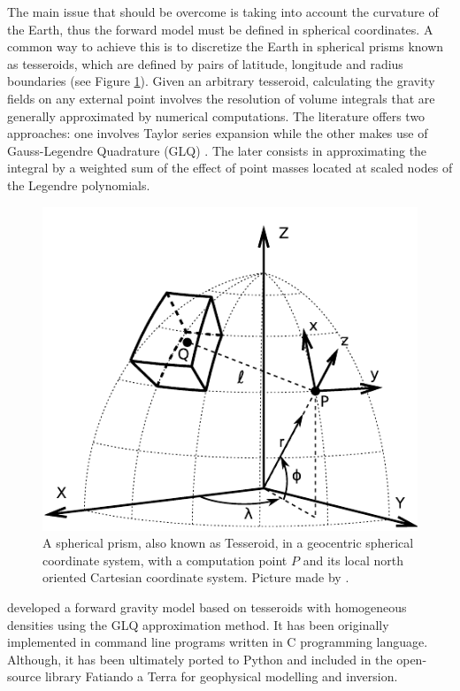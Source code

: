 \documentclass[extra]{gji}
\begin{document}
The main issue that should be overcome is taking into account the curvature of the Earth, thus the forward model must be defined in spherical coordinates.
A common way to achieve this is to discretize the Earth in spherical prisms known as tesseroids, which are defined by pairs of latitude, longitude and radius boundaries (see Figure \ref{fig:tesseroid-uieda}).
Given an arbitrary tesseroid, calculating the gravity fields on any external point involves the resolution of volume integrals that are generally approximated by numerical computations.
The literature offers two approaches: one involves Taylor series expansion \citep{Heck2007, Grombein2013} while the other makes use of Gauss-Legendre Quadrature (GLQ) \citep{Asgharzadeh2007, Uieda2016, Uieda2017}.
The later consists in approximating the integral by a weighted sum of the effect of point masses located at scaled nodes of the Legendre polynomials.

\begin{figure}
\centering
\includegraphics[width=0.9\linewidth]{figures/tesseroid-uieda.pdf}
\caption{
A spherical prism, also known as  Tesseroid, in a geocentric spherical coordinate system, with a computation point $P$ and its local north oriented Cartesian coordinate system. Picture made by \citet{Uieda2015}.
}
\label{fig:tesseroid-uieda}
\end{figure}

\citet{Uieda2016} developed a forward gravity model based on tesseroids with homogeneous densities using the GLQ approximation method.
It has been originally implemented in command line programs written in C programming language.
Although, it has been ultimately ported to Python and included in the open-source library Fatiando a Terra \citep{Uieda2013} for geophysical modelling and inversion.
\end{document}
